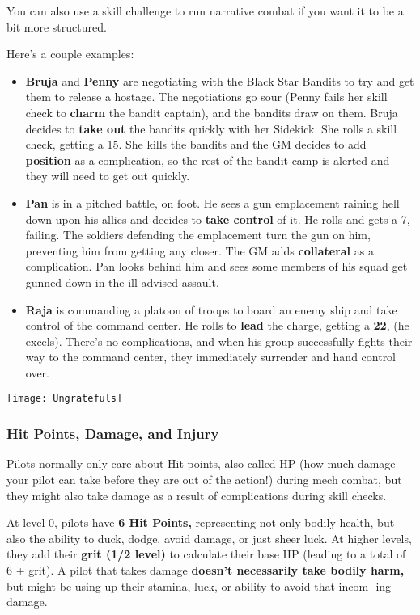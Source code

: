 You can also use a skill challenge to run narrative combat if you want it to be a bit more structured. 

Here's a couple examples:
\begin{itemize}
\item \textbf{Bruja} and \textbf{Penny} are negotiating with the Black Star Bandits to try and get them to release a hostage. The negotiations go sour (Penny fails her skill check to \textbf{charm} the bandit captain), and the bandits draw on them. Bruja decides to \textbf{take out} the bandits quickly with her Sidekick. She rolls a skill check, getting a 15. She kills the bandits and the GM decides to add \textbf{position} as a complication, so the rest of the bandit camp is alerted and they will need to get out quickly.
\item \textbf{Pan} is in a pitched battle, on foot. He sees a gun emplacement raining hell down upon his allies and decides to \textbf{take control} of it. He rolls and gets a 7, failing. The soldiers defending the emplacement turn the gun on him, preventing him from getting any closer. The GM adds \textbf{collateral} as a complication. Pan looks behind him and sees some members of his squad get gunned down in the ill-advised assault.
\item \textbf{Raja} is commanding a platoon of troops to board an enemy ship and take control of the command center. He rolls to \textbf{lead} the charge, getting a \textbf{22}, (he excels). There's no complications, and when his group successfully fights their way to the command center, they immediately surrender and hand control over.
\end{itemize}  

\newpage
\begin{center}
  \texttt{[image: Ungratefuls]}
\end{center}
\subsubsection{Hit Points, Damage, and Injury}

Pilots normally only care about Hit points, also called HP (how much damage your pilot can take before they are out of the action!) during mech combat, but they might also take damage as a result of complications during skill checks.

At level 0, pilots have \textbf{6 Hit Points,} representing not only bodily
health, but also the ability to duck, dodge, avoid damage, or just sheer luck.
At higher levels, they add their \textbf{grit (1/2 level)} to calculate their
base HP (leading to a total of 6 + grit). A pilot that takes damage
\textbf{doesn't necessarily take bodily harm,} but might be using up their
stamina, luck, or ability to avoid that incom- ing damage.

